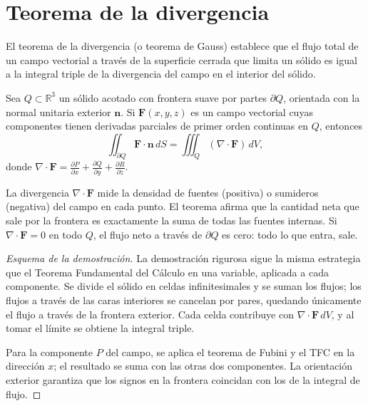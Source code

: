 \section{Teorema de la divergencia}

El teorema de la divergencia (o teorema de Gauss) establece que el flujo total de un campo vectorial a través de la superficie cerrada que limita un sólido es igual a la integral triple de la divergencia del campo en el interior del sólido.

\begin{theorem}
Sea $Q\subset\mathbb{R}^3$ un sólido acotado con frontera suave por partes $\partial Q$, orientada con la normal unitaria exterior $\mathbf{n}$. Si $\mathbf{F}(x,y,z)$ es un campo vectorial cuyas componentes tienen derivadas parciales de primer orden continuas en $Q$, entonces
\[
\iint_{\partial Q} \mathbf{F}\cdot\mathbf{n}\,dS
=
\iiint_Q (\nabla\cdot\mathbf{F})\,dV,
\]
donde $\displaystyle \nabla\cdot\mathbf{F} = \frac{\partial P}{\partial x} + \frac{\partial Q}{\partial y} + \frac{\partial R}{\partial z}$.
\end{theorem}

\begin{rem}
La divergencia $\nabla\cdot\mathbf{F}$ mide la densidad de fuentes (positiva) o sumideros (negativa) del campo en cada punto. El teorema afirma que la cantidad neta que sale por la frontera es exactamente la suma de todas las fuentes internas. Si $\nabla\cdot\mathbf{F}=0$ en todo $Q$, el flujo neto a través de $\partial Q$ es cero: todo lo que entra, sale.
\end{rem}

\begin{proof}[Esquema de la demostración]
La demostración rigurosa sigue la misma estrategia que el Teorema Fundamental del Cálculo en una variable, aplicada a cada componente. Se divide el sólido en celdas infinitesimales y se suman los flujos; los flujos a través de las caras interiores se cancelan por pares, quedando únicamente el flujo a través de la frontera exterior. Cada celda contribuye con $\nabla\cdot\mathbf{F}\,dV$, y al tomar el límite se obtiene la integral triple. 
\par
Para la componente $P$ del campo, se aplica el teorema de Fubini y el TFC en la dirección $x$; el resultado se suma con las otras dos componentes. La orientación exterior garantiza que los signos en la frontera coincidan con los de la integral de flujo.
\end{proof}

